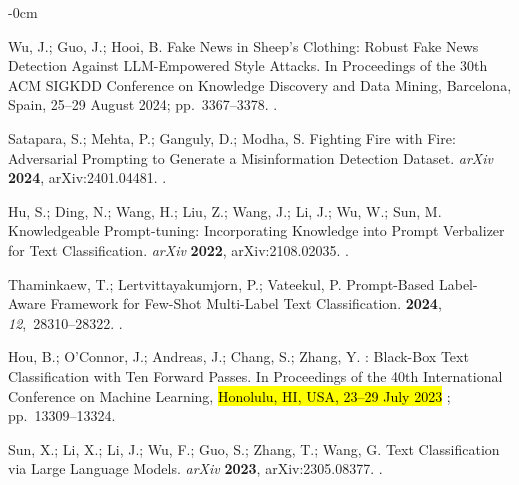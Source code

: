 \documentclass[electronics,article,accept,pdftex,moreauthors,electronics]{Definitions/mdpi}
\begin{document}
\begin{adjustwidth}{-\extralength}{0cm}
\begin{thebibliography}{999}
Wu, J.; Guo, J.; Hooi, B.
\newblock Fake {News} in {Sheep}'s {Clothing}: {Robust} {Fake} {News}
  {Detection} {Against} {LLM}-{Empowered} {Style} {Attacks}.
\newblock In Proceedings of the  30th {ACM} {SIGKDD}
  {Conference} on {Knowledge} {Discovery} and {Data} {Mining}, Barcelona, Spain, 25--29 August 2024; pp.~3367--3378.
.

Satapara, S.; Mehta, P.; Ganguly, D.; Modha, S.
\newblock Fighting {Fire} with {Fire}: {Adversarial} {Prompting} to {Generate}
  a {Misinformation} {Detection} {Dataset}. \emph{arXiv} \textbf{2024}, arXiv:2401.04481.
.

Hu, S.; Ding, N.; Wang, H.; Liu, Z.; Wang, J.; Li, J.; Wu, W.; Sun, M.
\newblock Knowledgeable {Prompt}-tuning: {Incorporating} {Knowledge} into
  {Prompt} {Verbalizer} for {Text} {Classification}. \emph{arXiv} \textbf{2022}, arXiv:2108.02035.
.

Thaminkaew, T.; Lertvittayakumjorn, P.; Vateekul, P.
\newblock Prompt-{Based} {Label}-{Aware} {Framework} for {Few}-{Shot}
  {Multi}-{Label} {Text} {Classification}.
 {\bf 2024}, {\em 12},~28310--28322.
.

Hou, B.; O’Connor, J.; Andreas, J.; Chang, S.; Zhang, Y.
: {Black}-{Box} {Text} {Classification} with {Ten}
  {Forward} {Passes}.
\newblock In Proceedings of the 40th {International} {Conference} on {Machine} {Learning},  \hl{Honolulu, HI, USA, 23--29 July 2023}%
; pp.~13309--13324.


Sun, X.; Li, X.; Li, J.; Wu, F.; Guo, S.; Zhang, T.; Wang, G.
\newblock Text {Classification} via {Large} {Language} {Models}. \emph{arXiv} \textbf{2023}, arXiv:2305.08377.
.


\end{thebibliography}
\end{adjustwidth}
\end{document}
